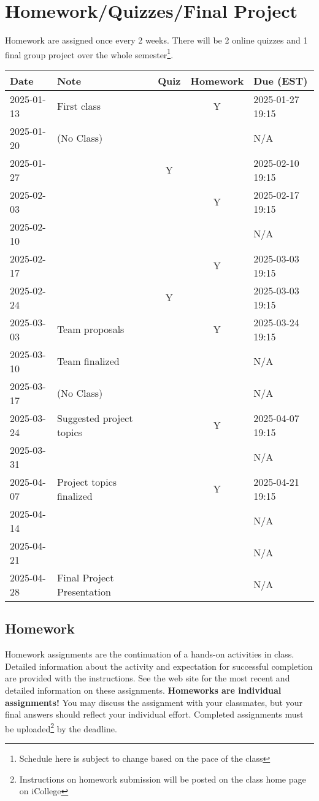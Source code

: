\documentclass[a4paper, 12pt]{article}
\begin{document}
\section{Homework/Quizzes/Final Project}
Homework are assigned once every 2 weeks. There will be 2 online quizzes and 1 final group project over the whole semester\footnote{Schedule here is subject to change based on the pace of the class}.
\begin{center}
  \begin{tabular}{ l|l|c|c|l }
      \hline			
      Date & Note & Quiz & Homework & Due (EST)\\
      \hline
      2025-01-13 & First class &  & Y & 2025-01-27 19:15 \\
      2025-01-20 & (No Class) &  &  & N/A \\
      2025-01-27 &  & Y &  & 2025-02-10 19:15 \\
      2025-02-03 &  &  & Y & 2025-02-17 19:15 \\
      2025-02-10 &  &  &  & N/A \\
      2025-02-17 &  &  & Y & 2025-03-03 19:15 \\
      2025-02-24 &   & Y &  & 2025-03-03 19:15 \\
      2025-03-03 & Team proposals &  & Y & 2025-03-24 19:15 \\
      2025-03-10 & Team finalized &  &  & N/A \\
      2025-03-17 & (No Class) &  &  & N/A \\
      2025-03-24 & Suggested project topics &  & Y & 2025-04-07 19:15 \\
      2025-03-31 &  &  &  & N/A \\
      2025-04-07 & Project topics finalized &  & Y & 2025-04-21 19:15 \\
      2025-04-14 &  &  &  & N/A \\
      2025-04-21 &  &  &  & N/A \\
      2025-04-28 & Final Project Presentation &  &  & N/A \\
      \hline  
  \end{tabular}
\end{center}

\subsection{Homework}
Homework assignments are the continuation of a hands-on activities in class. Detailed information about the activity and expectation for successful completion are provided with the instructions. See the web site for the most recent and detailed information on these assignments. \textbf{Homeworks are individual assignments!} You may discuss the assignment with your classmates, but your ﬁnal answers should reﬂect your individual eﬀort. Completed assignments must be uploaded\footnote{Instructions on homework submission will be posted on the class home page on iCollege} by the deadline.
\end{document}

